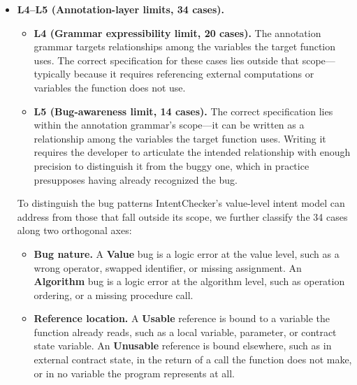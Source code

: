 \documentclass[pdflatex,sn-basic]{sn-jnl}%
\theoremstyle{thmstyleone}%
\theoremstyle{thmstyletwo}%
\theoremstyle{thmstylethree}%
\begin{document}
\begin{itemize}
  \item \textbf{L4--L5 (Annotation-layer limits, 34 cases).}
  \begin{itemize}
    \item \textbf{L4 (Grammar expressibility limit, 20 cases).} The annotation grammar targets relationships among the variables the target function uses. The correct specification for these cases lies outside that scope---typically because it requires referencing external computations or variables the function does not use.
    \item \textbf{L5 (Bug-awareness limit, 14 cases).} The correct specification lies within the annotation grammar's scope---it can be written as a relationship among the variables the target function uses. Writing it requires the developer to articulate the intended relationship with enough precision to distinguish it from the buggy one, which in practice presupposes having already recognized the bug.
  \end{itemize}

  \noindent To distinguish the bug patterns IntentChecker's value-level intent model can address from those that fall outside its scope, we further classify the 34 cases along two orthogonal axes:
  \begin{itemize}
    \item \textbf{Bug nature.} A \textbf{Value} bug is a logic error at the value level, such as a wrong operator, swapped identifier, or missing assignment. An \textbf{Algorithm} bug is a logic error at the algorithm level, such as operation ordering, or a missing procedure call.
    \item \textbf{Reference location.} A \textbf{Usable} reference is bound to a variable the function already reads, such as a local variable, parameter, or contract state variable. An \textbf{Unusable} reference is bound elsewhere, such as in external contract state, in the return of a call the function does not make, or in no variable the program represents at all.
  \end{itemize}


\end{itemize}
\end{document}
